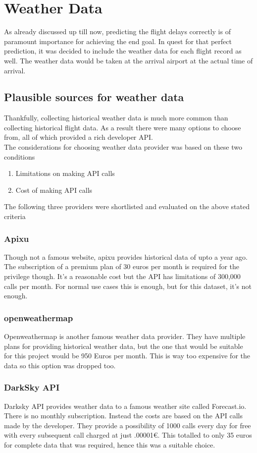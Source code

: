 \chapter{Weather Data}
As already discussed up till now, predicting the flight delays correctly is of paramount importance for achieving the end goal. In quest for that perfect prediction, it was decided to include the weather data for each flight record as well. The weather data would be taken at the arrival airport at the actual time of arrival. 

\section{Plausible sources for weather data}
Thankfully, collecting historical weather data is much more common than collecting historical flight data. As a result there were many options to choose from, all of which provided a rich developer API.
\\The considerations for choosing weather data provider was based on these two conditions
\begin{enumerate}
    \item Limitations on making API calls
    \item Cost of making API calls
\end{enumerate}
The following three providers were shortlisted and evaluated on the above stated criteria
\subsection{Apixu}
Though not a famous website, apixu provides historical data of upto a year ago. The subscription of a premium plan of 30 euros per month is required for the privilege though. It's a reasonable cost but the API has limitations of 300,000 calls per month. For normal use cases this is enough, but for this dataset, it's not enough.

\subsection{openweathermap}
Openweathermap is another famous weather data provider. They have multiple plans for providing historical weather data, but the one that would be suitable for this project would be 950 Euros per month. This is way too expensive for the data so this option was dropped too.

\subsection{DarkSky API}
Darksky API provides weather data to a famous weather site called Forecast.io. There is no monthly subscription. Instead the costs are based on the API calls made by the developer. They provide a possibility of 1000 calls every day for free with every subsequent call charged at just .00001€. This totalled to only 35 euros for complete data that was required, hence this was a suitable choice. 

